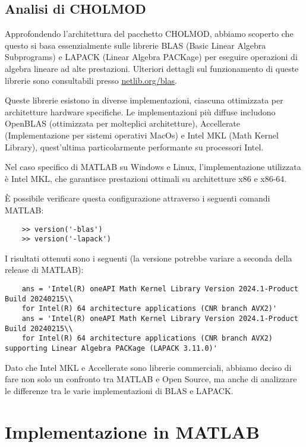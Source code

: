 \subsection{Analisi di CHOLMOD}

Approfondendo l'architettura del pacchetto CHOLMOD, abbiamo scoperto che questo si basa essenzialmente sulle librerie 
BLAS (Basic Linear Algebra Subprograms) e LAPACK (Linear Algebra PACKage) per eseguire operazioni di algebra lineare 
ad alte prestazioni. Ulteriori dettagli sul funzionamento di queste librerie sono consultabili presso 
\href{https://netlib.org/blas/}{netlib.org/blas}.

Queste librerie esistono in diverse implementazioni, ciascuna ottimizzata per architetture hardware specifiche.
Le implementazioni più diffuse includono OpenBLAS (ottimizzata per molteplici architetture), Accellerate 
(Implementazione per sistemi operativi MacOs) e Intel MKL (Math Kernel Library), 
quest'ultima particolarmente performante su processori Intel.

Nel caso specifico di MATLAB su Windows e Linux, l'implementazione utilizzata è Intel MKL, 
che garantisce prestazioni ottimali su architetture x86 e x86-64.

È possibile verificare questa configurazione attraverso i seguenti comandi MATLAB:
\begin{verbatim}
    >> version('-blas')
    >> version('-lapack')
\end{verbatim}

I risultati ottenuti sono i seguenti (la versione potrebbe variare a seconda della release di MATLAB):
\begin{verbatim}
    ans = 'Intel(R) oneAPI Math Kernel Library Version 2024.1-Product Build 20240215\\
    for Intel(R) 64 architecture applications (CNR branch AVX2)'
    ans = 'Intel(R) oneAPI Math Kernel Library Version 2024.1-Product Build 20240215\\
    for Intel(R) 64 architecture applications (CNR branch AVX2) supporting Linear Algebra PACKage (LAPACK 3.11.0)'
\end{verbatim}

Dato che Intel MKL e Accellerate sono librerie commerciali, abbiamo deciso di fare non solo un confronto tra MATLAB e Open Source,
ma anche di analizzare le differenze tra le varie implementazioni di BLAS e LAPACK.

\section{Implementazione in MATLAB}

